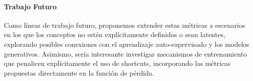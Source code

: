 \documentclass[12pt]{article}
\begin{document}
\paragraph{Trabajo Futuro}
Como líneas de trabajo futuro, proponemos extender estas métricas a escenarios en los que los conceptos no estén explícitamente definidos o sean latentes, explorando posibles conexiones con el aprendizaje auto-supervisado y los modelos generativos. Asimismo, sería interesante investigar mecanismos de entrenamiento que penalicen explícitamente el uso de shortcuts, incorporando las métricas propuestas directamente en la función de pérdida.



\end{document}
